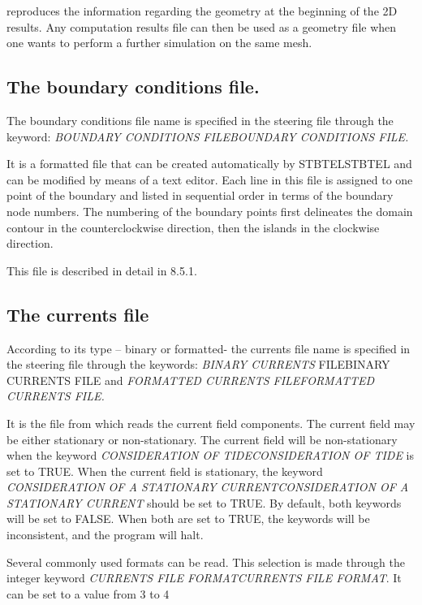  \tomawac reproduces the information regarding the geometry at the beginning of the 2D results. Any computation results file can then be used as a geometry file when one wants to perform a further simulation on the same mesh.


\subsection{ The boundary conditions file. }

 The boundary conditions file name is specified in the steering file through the keyword: \textit{BOUNDARY CONDITIONS FILEBOUNDARY CONDITIONS FILE.}

 It is a formatted file that can be created automatically by STBTELSTBTEL and can be modified by means of a text editor. Each line in this file is assigned to one point of the boundary and listed in sequential order in terms of the boundary node numbers. The numbering of the boundary points first delineates the domain contour in the counterclockwise direction, then the islands in the clockwise direction.

 This file is described in detail in 8.5.1.


\subsection{ The currents file}

 According to its type -- binary or formatted- the currents file name is specified in the steering file through the keywords: \textit{BINARY CURRENTS }FILEBINARY CURRENTS FILE and\textit{ FORMATTED CURRENTS FILEFORMATTED CURRENTS FILE.}

 It is the file from which \tomawac reads the current field components. The current field may be either stationary or non-stationary. The current field will be non-stationary when the keyword \textit{CONSIDERATION OF TIDECONSIDERATION OF TIDE }is set to TRUE. When the current field is stationary, the keyword \textit{CONSIDERATION OF A STATIONARY CURRENTCONSIDERATION OF A STATIONARY CURRENT} should be set to TRUE. By default, both keywords will be set to FALSE. When both are set to TRUE, the keywords will be inconsistent, and the program will halt.

 Several commonly used formats can be read. This selection is made through the integer keyword \textit{CURRENTS FILE FORMATCURRENTS FILE FORMAT}. It can\textit{ }be set to a value from 3 to 4

